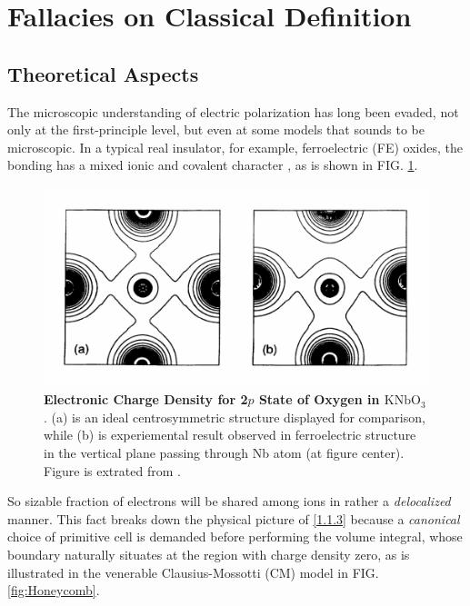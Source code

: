 \documentclass[10pt,nofootinbib]{revtex4}
\newcounter{Def}[section]
\begin{document}
\section{Fallacies on Classical Definition}
	\subsection{Theoretical Aspects}
		The microscopic understanding of electric polarization has long been evaded, not only at the first-principle level, but even at some models that sounds to be microscopic. In a typical real insulator, for example, ferroelectric (FE) oxides, the bonding has a mixed ionic and covalent character \cite{posternak1994role}, as is shown in FIG. \ref{fig:KNbO3}.
		\begin{figure}[!htp]
			\centering
			\includegraphics[scale=1.2]{KNbO3.pdf}
			\caption{{\bf Electronic Charge Density for 2$p$ State of Oxygen in $\mathrm{KNbO_3}$}. (a) is an ideal centrosymmetric structure displayed for comparison, while (b) is experiemental result observed in ferroelectric structure in the vertical plane passing through Nb atom (at figure center). Figure is extrated from \cite{posternak1994role}.}
			\label{fig:KNbO3}
		\end{figure}
		So sizable fraction of electrons will be shared among ions in rather a \emph{delocalized} manner. This fact breaks down the physical picture of \eqref{1.1.3} because a \emph{canonical} choice of primitive cell is demanded before performing the volume integral, whose boundary naturally situates at the region with charge density zero, as is illustrated in the venerable Clausius-Mossotti (CM) model \cite{resta2007theory} in FIG. \ref{fig:Honeycomb}.\par
\end{document}
